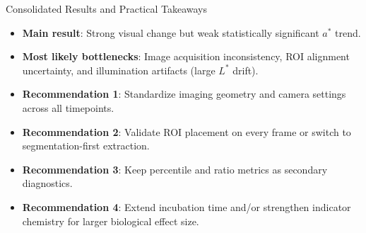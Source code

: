 \documentclass{beamer}
\begin{document}


\begin{frame}{Consolidated Results and Practical Takeaways}
\begin{itemize}
    \item \textbf{Main result}: Strong visual change but weak statistically significant $a^*$ trend.
    \item \textbf{Most likely bottlenecks}: Image acquisition inconsistency, ROI alignment uncertainty, and illumination artifacts (large $L^*$ drift).
    \item \textbf{Recommendation 1}: Standardize imaging geometry and camera settings across all timepoints.
    \item \textbf{Recommendation 2}: Validate ROI placement on every frame or switch to segmentation-first extraction.
    \item \textbf{Recommendation 3}: Keep percentile and ratio metrics as secondary diagnostics.
    \item \textbf{Recommendation 4}: Extend incubation time and/or strengthen indicator chemistry for larger biological effect size.
\end{itemize}
\end{frame}
\end{document}
